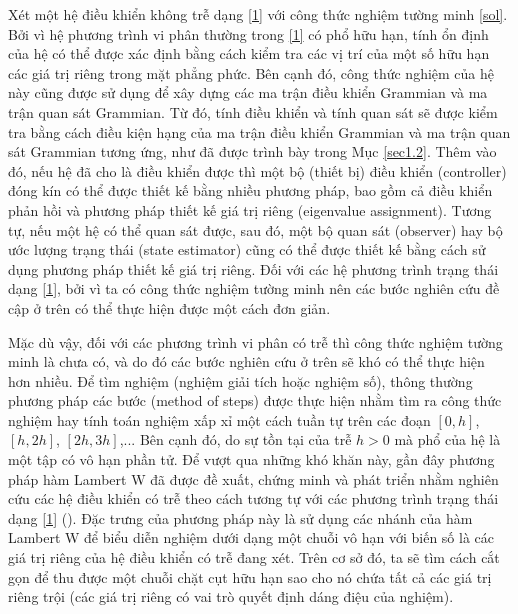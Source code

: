 Xét một hệ điều khiển không trễ dạng \eqref{1} với công thức nghiệm tường minh \eqref{sol}. Bởi vì hệ phương trình vi phân thường trong \eqref{1} có phổ hữu hạn, tính ổn định của hệ có thể được xác định bằng cách kiểm tra các vị trí của một số hữu hạn các giá trị riêng trong mặt phẳng phức. Bên cạnh đó, công thức nghiệm của hệ này cũng được sử dụng để xây dựng các ma trận điều khiển Grammian và ma trận quan sát Grammian. Từ đó, tính điều khiển  và tính quan sát sẽ được kiểm tra bằng cách điều kiện hạng của ma trận điều khiển Grammian và ma trận quan sát Grammian tương ứng, như đã được trình bày trong Mục \eqref{sec1.2}. 
%
Thêm vào đó, nếu hệ đã cho là điều khiển được thì một bộ (thiết bị) điều khiển (controller) đóng kín có thể được thiết kế bằng nhiều phương pháp, bao gồm cả điều khiển phản hồi và phương pháp thiết kế giá trị riêng (eigenvalue assignment). Tương tự, nếu một hệ có thể quan sát được, sau đó, một bộ quan sát (observer) hay bộ ước lượng trạng thái (state estimator) cũng có thể được thiết kế bằng cách sử dụng phương pháp thiết kế giá trị riêng. 
Đối với các hệ phương trình trạng thái dạng \eqref{1}, bởi vì ta có công thức nghiệm tường minh nên các bước nghiên cứu đề cập ở trên có thể thực hiện được một cách đơn giản.

Mặc dù vậy, đối với các phương trình vi phân có trễ thì công thức nghiệm tường minh là chưa có, và do đó các bước nghiên cứu ở trên sẽ khó có thể thực hiện hơn nhiều. Để tìm nghiệm (nghiệm giải tích hoặc nghiệm số), thông thường phương pháp các bước (method of steps) được thực hiện nhằm tìm ra công thức nghiệm hay tính toán nghiệm xấp xỉ một cách tuần tự trên các đoạn $[0,h]$, $[h,2h]$, $[2h,3h]$,... 
Bên cạnh đó, do sự tồn tại của trễ $h>0$ mà phổ của hệ là một tập có vô hạn phần tử. Để vượt qua những khó khăn này, gần đây phương pháp hàm Lambert W đã được đề xuất, chứng minh và phát triển nhằm nghiên cứu các hệ điều khiển có trễ theo cách tương tự với các phương trình trạng thái dạng \eqref{1} (\cite{AslU03,YiEig10}). Đặc trưng của phương pháp này là sử dụng các nhánh của hàm Lambert W để biểu diễn nghiệm dưới dạng một chuỗi vô hạn với biến số là các giá trị riêng của hệ điều khiển có trễ đang xét. Trên cơ sở đó, ta sẽ tìm cách cắt gọn để thu được một chuỗi chặt cụt hữu hạn sao cho nó chứa tất cả các giá trị riêng trội (các giá trị riêng có vai trò quyết định dáng điệu của nghiệm). 


